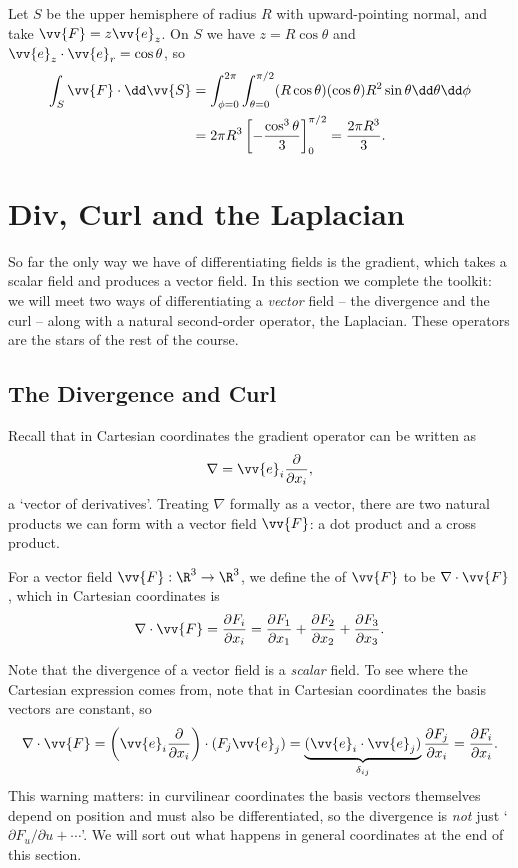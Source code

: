 \begin{example}
	Let $S$ be the upper hemisphere of radius $R$ with upward-pointing normal, and take $\vv{F} = z \vv{e}_z$. On $S$ we have $z = R\cos \theta$ and $\vv{e}_z \cdot \vv{e}_r = \cos \theta$, so
	\begin{align*}
		\int_S \vv{F} \cdot \dd \vv{S} &= \int_{\phi = 0}^{2 \pi} \int_{\theta = 0}^{\pi/2} (R \cos \theta)( \cos \theta) R^2 \sin \theta \dd \theta \dd \phi \\
		&= 2 \pi R^3 \left[-\frac{\cos^3 \theta}{3}\right]_0^{\pi/2} = \frac{2 \pi R^3}{3}.
	\end{align*}
\end{example}
\section{Div, Curl and the Laplacian}

So far the only way we have of differentiating fields is the gradient, which takes a scalar field and produces a vector field. In this section we complete the toolkit: we will meet two ways of differentiating a \emph{vector} field -- the divergence and the curl -- along with a natural second-order operator, the Laplacian. These operators are the stars of the rest of the course.

\subsection{The Divergence and Curl}

Recall that in Cartesian coordinates the gradient operator can be written as
$$
\nabla = \vv{e}_i \frac{\partial}{\partial x_i},
$$
a `vector of derivatives'. Treating $\nabla$ formally as a vector, there are two natural products we can form with a vector field $\vv{F}$: a dot product and a cross product.

\begin{definition}[Divergence]
	For a vector field $\vv{F}: \R^3 \rightarrow \R^3$, we define the  of $\vv{F}$ to be $\nabla \cdot \vv{F}$, which in Cartesian coordinates is
	$$
	\nabla \cdot \vv{F} = \frac{\partial F_i}{\partial x_i} = \frac{\partial F_1}{\partial x_1} + \frac{\partial F_2}{\partial x_2} + \frac{\partial F_3}{\partial x_3}.
	$$
\end{definition}

Note that the divergence of a vector field is a \emph{scalar} field. To see where the Cartesian expression comes from, note that in Cartesian coordinates the basis vectors are constant, so
$$
\nabla \cdot \vv{F} = \left(\vv{e}_i \frac{\partial}{\partial x_i}\right) \cdot (F_j \vv{e}_j) = \underbrace{(\vv{e}_i \cdot \vv{e}_j)}_{\delta_{ij}} \frac{\partial F_j}{\partial x_i} = \frac{\partial F_i}{\partial x_i}.
$$
This warning matters: in curvilinear coordinates the basis vectors themselves depend on position and must also be differentiated, so the divergence is \emph{not} just `$\partial F_u / \partial u + \cdots$'. We will sort out what happens in general coordinates at the end of this section.

